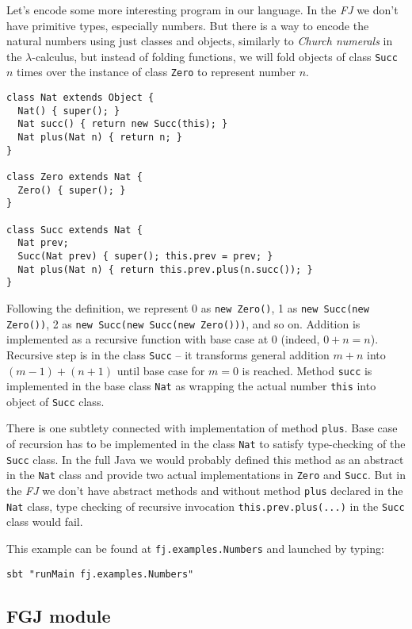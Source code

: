 \documentclass{article}[12pt]
\begin{document}
Let's encode some more interesting program in our language. In
the \emph{FJ} we don't have primitive types, especially numbers.
But there is a way to encode the natural numbers using just classes
and objects, similarly to \emph{Church numerals} in
the $\lambda$-calculus, but instead of folding functions, we
will fold objects of class \texttt{Succ} $n$ times over the
instance of class \texttt{Zero} to represent number $n$.

\begin{verbatim}
class Nat extends Object {
  Nat() { super(); }
  Nat succ() { return new Succ(this); }
  Nat plus(Nat n) { return n; }
}

class Zero extends Nat { 
  Zero() { super(); }
}

class Succ extends Nat {
  Nat prev;
  Succ(Nat prev) { super(); this.prev = prev; }
  Nat plus(Nat n) { return this.prev.plus(n.succ()); }
}
\end{verbatim}
Following the definition, we represent 0 as \texttt{new Zero()},
1 as \texttt{new Succ(new Zero())},
2 as \texttt{new Succ(new Succ(new Zero()))}, and so on.
Addition is implemented as a recursive function with base case
at 0 (indeed, $0 + n = n$). Recursive step is in the class
\texttt{Succ} -- it transforms general addition $m + n$ into
$(m-1) + (n+1)$ until base case for $m = 0$ is reached.
Method \texttt{succ} is implemented in the base class
\texttt{Nat} as wrapping the actual number \texttt{this}
into object of \texttt{Succ} class.

There is one subtlety connected with implementation of method
\texttt{plus}. Base case of recursion has to be implemented in
the class \texttt{Nat} to satisfy type-checking of the
\texttt{Succ} class. In the full Java we would probably
defined this method as an abstract in the \texttt{Nat} class
and provide two actual implementations in \texttt{Zero} and 
\texttt{Succ}. But in the \emph{FJ} we don't have abstract
methods and without method \texttt{plus} declared in
the \texttt{Nat} class, type checking of recursive invocation 
\texttt{this.prev.plus(...)} in the \texttt{Succ} class
would fail.

This example can be found at \texttt{fj.examples.Numbers}
and launched by typing:

\begin{verbatim}
sbt "runMain fj.examples.Numbers"
\end{verbatim}


\subsection{FGJ module}
\end{document}
